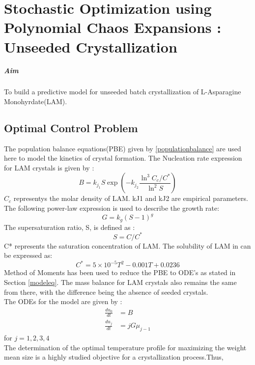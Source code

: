 \chapter{Stochastic Optimization using Polynomial Chaos Expansions : Unseeded Crystallization}

\paragraph{Aim} To build a predictive model for unseeded batch crystallization of L-Asparagine Monohyrdate(LAM). 


\section{Optimal Control Problem}

The population balance equations(PBE) given by \ref{populationbalance} are used here to model the kinetics of crystal formation. The Nucleation rate expression for LAM crystals is given by\cite{lindenberg} :
\begin{equation}
B = k_{j_{1}}S\exp\left( -k_{j_{2}}\frac{\ln^{3}{C_{c}/C^{*}}}{\ln^{2}S}\right) 
\end{equation}
$C_{c}$ representys the  molar density of LAM. kJ1 and kJ2 are
empirical parameters. The following power-law expression is used to describe the growth rate\cite{nagy}\cite{nagy2}:
\begin{equation}
G = k_{g}(S-1)^{g}
\end{equation}
The supersaturation ratio, S, is defined as :
\begin{equation}
S = C/C^{*}
\end{equation}
C* represents the saturation concentration of LAM. The solubility of LAM in 
can be expressed as:
\begin{equation}
C^{*} = 5 \times 10^{-5}T^{2} - 0.001T + 0.0236
\end{equation}
Method of Moments has been used to reduce the PBE to ODE's as stated in Section \ref{modeleq}. The mass balance for LAM crystals also remains the same from there, with the difference being the absence of seeded crystals.\\
The ODEs for the model are given by :
\begin{align}
\frac{du_{0}}{dt} &= B \\
\frac{du_{j}}{dt} &= jG\mu_{j-1}
\end{align}
for  $j = 1,2,3,4 $
\\
The determination of the optimal temperature profile for maximizing the weight mean size is a highly studied objective for a crystallization process.Thus, 

